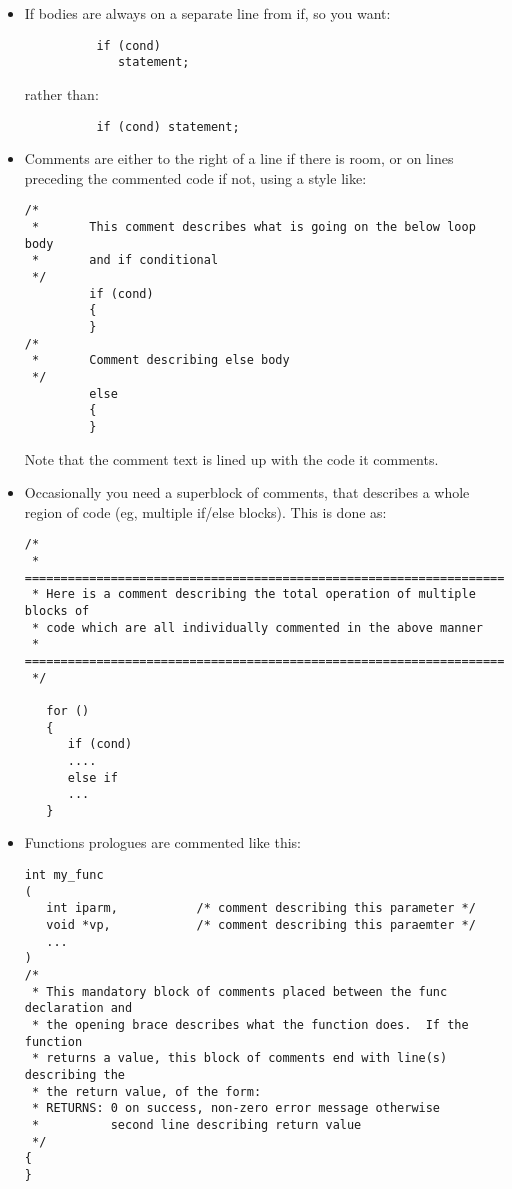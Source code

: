 \documentclass[11pt]{article}
\begin{document}
\begin{itemize}
\item If bodies are always on a separate line from if, so you want:
      \vspace*{-0.1in}
      \begin{verbatim}
          if (cond)
             statement;
      \end{verbatim}
      \vspace*{-0.3in}
      rather than:
      \vspace*{-0.1in}
      \begin{verbatim}
          if (cond) statement;
      \end{verbatim}
\item Comments are either to the right of a line if there is room, or on
      lines preceding the commented code if not, using a style like:
      \vspace*{-0.1in}
      \begin{verbatim}
/*
 *       This comment describes what is going on the below loop body
 *       and if conditional
 */
         if (cond)
         {
         }
/*
 *       Comment describing else body
 */
         else
         {
         }
      \end{verbatim}
      \vspace*{-0.2in}
       Note that the comment text is lined up with the code it comments.
\item Occasionally you need a superblock of comments, that describes a whole
      region of code (eg, multiple if/else blocks).  This is done as:
      \vspace*{-0.1in}
\begin{verbatim}
/*
 * ======================================================================
 * Here is a comment describing the total operation of multiple blocks of
 * code which are all individually commented in the above manner
 * ======================================================================
 */

   for ()
   {
      if (cond)
      ....
      else if
      ...
   }
\end{verbatim}
\item Functions prologues are commented like this:
\begin{verbatim}
int my_func
(
   int iparm,           /* comment describing this parameter */
   void *vp,            /* comment describing this paraemter */
   ...
)
/*
 * This mandatory block of comments placed between the func declaration and
 * the opening brace describes what the function does.  If the function
 * returns a value, this block of comments end with line(s) describing the
 * the return value, of the form:
 * RETURNS: 0 on success, non-zero error message otherwise
 *          second line describing return value
 */
{
}
\end{verbatim}

\end{itemize}
\end{document}
